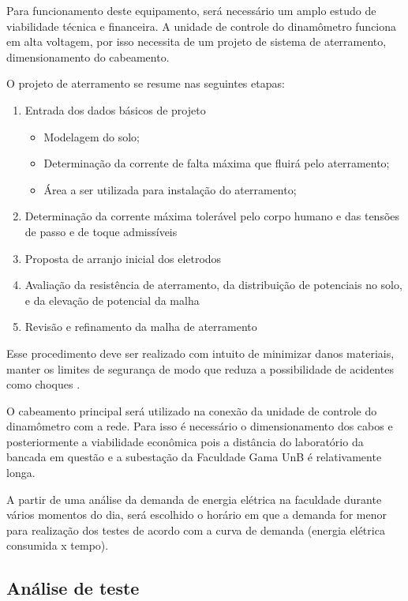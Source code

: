 Para funcionamento deste equipamento, será necessário um amplo estudo de viabilidade técnica e financeira. A unidade de controle do dinamômetro funciona em alta voltagem, por isso necessita de um projeto de sistema de aterramento, dimensionamento do cabeamento.

O projeto de aterramento se resume nas seguintes etapas:

\begin{enumerate}
	\item Entrada dos dados básicos de projeto
	\begin{itemize}
		\item Modelagem do solo;
		\item Determinação da corrente de falta máxima que fluirá pelo aterramento;
		\item Área a ser utilizada para instalação do aterramento; 
	\end{itemize}
	\item Determinação da corrente máxima tolerável pelo corpo humano e das tensões de passo e de toque admissíveis
	\item Proposta de arranjo inicial dos eletrodos
	\item Avaliação da resistência de aterramento, da distribuição de potenciais no solo, e da elevação de potencial da malha
	\item Revisão e refinamento da malha de aterramento
\end{enumerate}

Esse procedimento deve ser realizado com intuito de minimizar danos materiais, manter os limites de segurança de modo que reduza a possibilidade de acidentes como choques \cite{raggi2009}.

O cabeamento principal será utilizado na conexão da unidade de controle do dinamômetro com a rede. Para isso é necessário o dimensionamento dos cabos e posteriormente a viabilidade econômica pois a distância do laboratório da bancada em questão e a subestação da Faculdade Gama UnB é relativamente longa.

A partir de uma análise da demanda de energia elétrica na faculdade durante vários momentos do dia, será escolhido o horário em que a demanda for menor para realização dos testes de acordo com a curva de demanda (energia elétrica consumida x tempo).

\subsection{Análise de teste}

